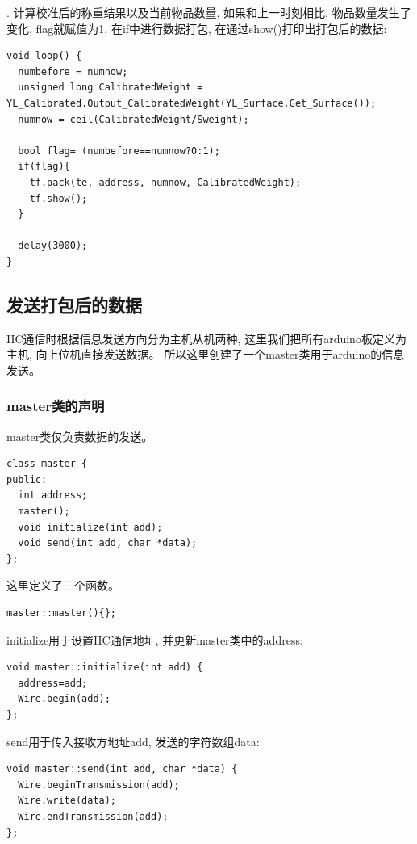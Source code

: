 \documentclass{article}
\begin{document}
. 计算校准后的称重结果以及当前物品数量, 如果和上一时刻相比, 物品数量发生了变化, flag就赋值为1,
在if中进行数据打包, 在通过show()打印出打包后的数据:

\begin{lstlisting}
void loop() {
  numbefore = numnow;
  unsigned long CalibratedWeight = YL_Calibrated.Output_CalibratedWeight(YL_Surface.Get_Surface());
  numnow = ceil(CalibratedWeight/Sweight);

  bool flag= (numbefore==numnow?0:1);
  if(flag){
    tf.pack(te, address, numnow, CalibratedWeight);
    tf.show();
  }

  delay(3000);
}
\end{lstlisting}

\subsection{发送打包后的数据}
IIC通信时根据信息发送方向分为主机从机两种, 这里我们把所有arduino板定义为主机, 向上位机直接发送数据。
所以这里创建了一个master类用于arduino的信息发送。

\subsubsection{master类的声明}
master类仅负责数据的发送。
\begin{lstlisting}
class master {
public:
  int address;
  master();
  void initialize(int add);
  void send(int add, char *data);
};
\end{lstlisting}

这里定义了三个函数。
\begin{lstlisting}
master::master(){};  
\end{lstlisting}

initialize用于设置IIC通信地址, 并更新master类中的address:
\begin{lstlisting}
void master::initialize(int add) {
  address=add;
  Wire.begin(add);
}; 
\end{lstlisting}

send用于传入接收方地址add, 发送的字符数组data:
\begin{lstlisting}
void master::send(int add, char *data) {
  Wire.beginTransmission(add);
  Wire.write(data);
  Wire.endTransmission(add);
};
\end{lstlisting}
\end{document}
